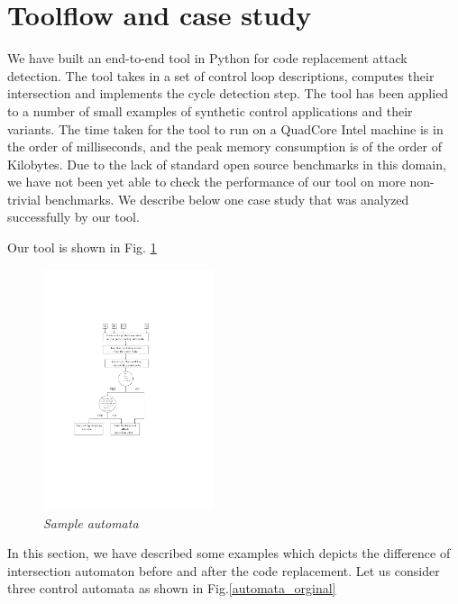 \section{Toolflow and case study} \label{sec5}
\noindent
We have built an end-to-end tool in Python for code replacement attack detection.
The tool takes in a set of control loop descriptions, computes their intersection and 
implements the cycle detection step. The tool has been applied to a number of small 
examples of synthetic control applications and their variants. The time taken for
the tool to run on a QuadCore Intel machine is in the order of milliseconds, and the
peak memory consumption is of the order of Kilobytes. Due to the lack of standard open
source benchmarks in this domain, we have not been yet able to check the performance of
our tool on more non-trivial benchmarks. We describe below one case study that was analyzed 
successfully by our tool.

Our tool is shown in Fig. \ref{tool_algorithm}

\begin{figure}
\begin{center}
\includegraphics[width=50mm]{algorithm.pdf}
\end{center}
\caption{{\em Sample automata}}
\label{tool_algorithm}
\end{figure}


In this section, we have described some examples which depicts the difference of intersection
automaton before and after the code replacement. 
Let us consider three control automata as shown in Fig.\ref{automata_orginal}

